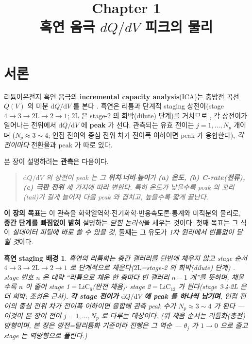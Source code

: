 \documentclass[11pt,a4paper]{article}
\title{\textbf{\LARGE Chapter 1}\\[0.35em]\Large 흑연 음극 $dQ/dV$ 피크의 물리}
\author{}
\date{}
\newtheorem*{stagebox}{흑연 staging 배경}
\newcommand{\dd}{\mathrm{d}}
\begin{document}
\maketitle

\section*{서론}
리튬이온전지 흑연 음극의 \textbf{incremental capacity analysis}(ICA)는 충방전 곡선 $Q(V)$ 의 미분
$\dd Q/\dd V$ 를 본다 \cite{bloom2005,dubarry2012}. 흑연은 리튬과 단계적 staging 상전이(stage $4\!\to\!3\!\to\!2\mathrm L\!\to\!2\!\to\!1$;
$2\mathrm L$ 은 stage-2 의 희박(dilute) 단계)를 거치므로 \cite{dahn1991,ohzuku1993,funabiki1999}, 각 상전이가
일어나는 전위에서 $\dd Q/\dd V$ 에 \textbf{peak} 가 선다. 관측되는 유효 전이는 $j=1,\dots,N_p$ 개이며
($N_p\approx3\sim4$; 인접 전이의 중심 전위 차가 전이폭 이하이면 peak 가 융합한다), \emph{각 전이마다} 전환율과
peak 가 따로 있다.

본 장이 설명하려는 \textbf{관측}은 다음이다.
\begin{quote}\itshape
$\dd Q/\dd V$ 의 상전이 peak 는 그 \textbf{위치$\cdot$너비$\cdot$높이}가 \textbf{(a) 온도, (b) C-rate(전류),
(c) 극판 전위} 세 가지에 따라 변한다. 특히 \emph{온도가 낮을수록 peak 의 꼬리(tail)가 길게 늘어져 다음 peak
와 겹치고}, 높을수록 짧게 끝난다.
\end{quote}

\textbf{이 장의 목표}는 이 관측을 화학열역학$\cdot$전기화학$\cdot$반응속도론$\cdot$통계와 미적분의 물리로,
\textbf{중간 단계를 빠짐없이 밝혀} 설명하는 \emph{닫힌 논리식}을 세우는 것이다.
첫째 목표는 그 식이 \emph{실데이터 피팅에 바로 쓸 수 있을 것}, 둘째는 그 유도가 \emph{1차 원리에서 빈틈없이 닫힐 것}이다.

\begin{stagebox}
흑연의 리튬화는 층간 갤러리를 단번에 채우지 않고 \emph{stage} 순서 $4\to3\to2\mathrm L\to2\to1$ 로 단계적으로
채운다($2\mathrm L$=stage-2 의 희박(dilute) 단계) \cite{dahn1991,ohzuku1993}. stage 번호 $n$ 은 대략 ``리튬으로
채운 한 층마다 빈 갤러리 $n-1$ 개''를 뜻하며, 채울수록 $n$ 이 줄어 stage 1$=\mathrm{LiC_6}$(완전 채움)$\cdot$
stage 2$=\mathrm{LiC_{12}}$ 가 된다(stage 3$\cdot$4$\cdot$2L 은 더 희박; 조성은 근사). \textbf{각 stage 전이가
$\dd Q/\dd V$ 에 peak 를 하나씩 남기며}, 인접 전이의 중심 전위 차가 전이폭 이하이면 융합해 관측 peak 수가
$N_p\approx3\sim4$ 가 된다 — 이것이 본 장이 전이 $j=1,\dots,N_p$ 로 다루는 대상이다. (위 채움 순서는 \emph{리튬화(충전)} 방향이며, 본 장은
\emph{방전}=탈리튬화 기준이라 진행은 그 역순 — $\theta_j$ 가 $1\to0$ 으로 줄고 stage 는 역방향으로 풀린다.)
\end{stagebox}
\end{document}
